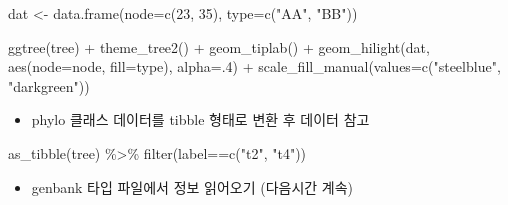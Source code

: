 \documentclass[
]{book}
\newenvironment{Shaded}{\begin{snugshade}}{\end{snugshade}}
\newcommand{\AttributeTok}[1]{\textcolor[rgb]{0.77,0.63,0.00}{#1}}
\newcommand{\DecValTok}[1]{\textcolor[rgb]{0.00,0.00,0.81}{#1}}
\newcommand{\FunctionTok}[1]{\textcolor[rgb]{0.00,0.00,0.00}{#1}}
\newcommand{\NormalTok}[1]{#1}
\newcommand{\OtherTok}[1]{\textcolor[rgb]{0.56,0.35,0.01}{#1}}
\newcommand{\SpecialCharTok}[1]{\textcolor[rgb]{0.00,0.00,0.00}{#1}}
\newcommand{\StringTok}[1]{\textcolor[rgb]{0.31,0.60,0.02}{#1}}
\providecommand{\tightlist}{%
  \setlength{\itemsep}{0pt}\setlength{\parskip}{0pt}}
\begin{document}
\begin{Shaded}
\begin{Highlighting}[]
\NormalTok{dat }\OtherTok{\textless{}{-}} \FunctionTok{data.frame}\NormalTok{(}\AttributeTok{node=}\FunctionTok{c}\NormalTok{(}\DecValTok{23}\NormalTok{, }\DecValTok{35}\NormalTok{), }\AttributeTok{type=}\FunctionTok{c}\NormalTok{(}\StringTok{"AA"}\NormalTok{, }\StringTok{"BB"}\NormalTok{))}

\FunctionTok{ggtree}\NormalTok{(tree) }\SpecialCharTok{+}
  \FunctionTok{theme\_tree2}\NormalTok{() }\SpecialCharTok{+}
  \FunctionTok{geom\_tiplab}\NormalTok{() }\SpecialCharTok{+}
  \FunctionTok{geom\_hilight}\NormalTok{(dat, }\FunctionTok{aes}\NormalTok{(}\AttributeTok{node=}\NormalTok{node, }\AttributeTok{fill=}\NormalTok{type), }\AttributeTok{alpha=}\NormalTok{.}\DecValTok{4}\NormalTok{) }\SpecialCharTok{+}
  \FunctionTok{scale\_fill\_manual}\NormalTok{(}\AttributeTok{values=}\FunctionTok{c}\NormalTok{(}\StringTok{"steelblue"}\NormalTok{, }\StringTok{"darkgreen"}\NormalTok{))}
\end{Highlighting}
\end{Shaded}

\begin{itemize}
\tightlist
\item
  phylo 클래스 데이터를 tibble 형태로 변환 후 데이터 참고
\end{itemize}

\begin{Shaded}
\begin{Highlighting}[]

\FunctionTok{as\_tibble}\NormalTok{(tree) }\SpecialCharTok{\%\textgreater{}\%} 
  \FunctionTok{filter}\NormalTok{(label}\SpecialCharTok{==}\FunctionTok{c}\NormalTok{(}\StringTok{"t2"}\NormalTok{, }\StringTok{"t4"}\NormalTok{))}
\end{Highlighting}
\end{Shaded}

\begin{itemize}
\tightlist
\item
  genbank 타입 파일에서 정보 읽어오기 (다음시간 계속)
\end{itemize}
\end{document}

